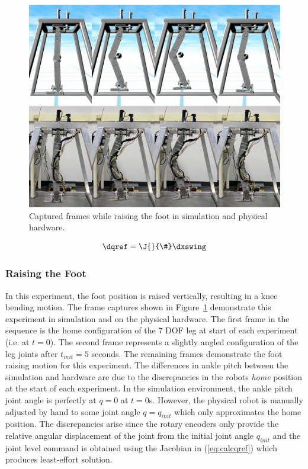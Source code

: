 \begin{figure}[!b]
	\centering
    \includegraphics[scale=0.35]{fig/experiments/kneebendframes.png} 
  	\caption{Captured frames while raising the foot in simulation and physical hardware.}
	\label{fig:kneebendframes}
\end{figure}

\begin{equation}
	\dqref = \J{}{\#} \dxswing
\end{equation}

\subsubsection{Raising the Foot} %
\label{ssub:knee_bending_motion}

In this experiment, the foot position is raised vertically, resulting in a knee bending motion. The frame captures shown in Figure~\ref{fig:kneebendframes} demonstrate this experiment in simulation and on the physical hardware. The first frame in the sequence is the home configuration of the 7 DOF leg at start of each experiment (i.e. at $t = 0$). The second frame represents a slightly angled configuration of the leg joints after $t_{init} = 5$ seconds. The remaining frames demonstrate the foot raising motion for this experiment. The differences in ankle pitch between the simulation and hardware are due to the discrepancies in the robots \emph{home} position at the start of each experiment. In the simulation environment, the ankle pitch joint angle is perfectly at $q = 0$ at $t = 0$s. However, the physical robot is manually adjusted by hand to some joint angle $q = q_{init}$ which only approximates the home position. The discrepancies arise since the rotary encoders only provide the relative angular displacement of the joint from the initial joint angle $q_{init}$ and the joint level command is obtained using the Jacobian in (\ref{eq:calcqref}) which produces least-effort solution. 

